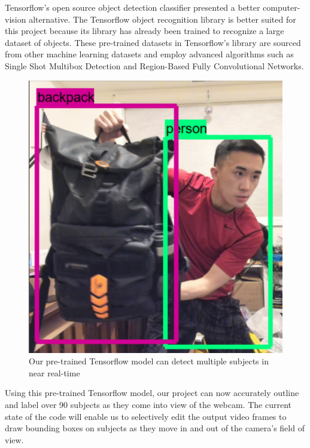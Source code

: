 \documentclass[onecolumn, draftclsnofoot,10pt, compsoc]{IEEEtran}
\makeatletter
\newcommand\captionof[1]{\def\@captype{#1}\caption}
\makeatother
\begin{document}
\begin{singlespace}
			Tensorflow's open source object detection classifier presented a better computer-vision alternative. \cite{tensorflow}
			The Tensorflow object recognition library is better suited for this project because its library has already been trained to recognize a large dataset of objects. \cite{convolutional_object_detectors}
			These pre-trained datasets in Tensorflow's library are sourced from other machine learning datasets and employ advanced algorithms such as Single Shot Multibox Detection and Region-Based Fully Convolutional Networks. \cite{coco} \cite{open_images} \cite{kitti}


			\begin{figure}[H]
			\includegraphics[scale=0.45]{tensorflow.PNG}
			\captionof{figure}{Our pre-trained Tensorflow model can  detect multiple subjects in near real-time}
			\label{tf-detect}
			\end{figure}


			Using this pre-trained Tensorflow model, our project can now accurately outline and label over 90 subjects as they come into view of the webcam.
			The current state of the code will enable us to selectively edit the output video frames to draw bounding boxes on subjects as they move in and out of the camera's field of view.



\end{singlespace}
\end{document}
